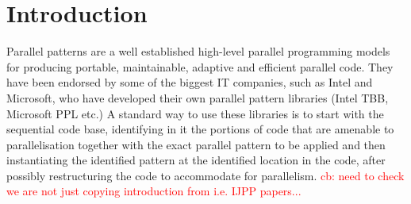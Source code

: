 %

\section{Introduction}

Parallel patterns are a well established high-level parallel programming models for producing portable, maintainable, adaptive and efficient parallel code. They have been endorsed by some of the biggest IT companies, such as Intel and Microsoft, who have developed their own parallel pattern libraries (Intel TBB, Microsoft PPL etc.) A standard way to use these libraries is to start with the sequential code base, identifying in it the portions of code that are amenable to parallelisation together with the exact parallel pattern to be applied and then instantiating the identified pattern at the identified location in the code, after possibly restructuring the code to accommodate for parallelism. 
\textcolor{red}{cb: need to check we are not just copying introduction from i.e. IJPP papers...}


